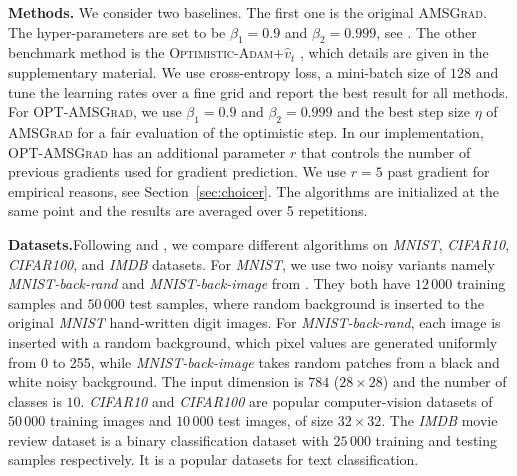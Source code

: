 \documentclass[twoside]{article}
\begin{document}
\textbf{Methods.}
We consider two baselines. The first one is the original \textsc{AMSGrad}. 
The hyper-parameters are set to be $\beta_1 = 0.9$ and $\beta_2 = 0.999$, see \citep{RKK18}. 
The other benchmark method is the \textsc{Optimistic-Adam$+\hat{v}_t$} \citep{DISZ18}, which details are given in the supplementary material. 
We use cross-entropy loss, a mini-batch size of $128$ and tune the learning rates over a fine grid and report the best result for all methods.
For \textsc{OPT-AMSGrad}, we use $\beta_1 = 0.9$ and $\beta_2 = 0.999$ and the best step size $\eta$ of \textsc{AMSGrad} for a fair evaluation of the optimistic step. In our implementation, \textsc{OPT-AMSGrad} has an additional parameter $r$ that controls the number of previous gradients used for gradient prediction. 
We use $r=5$ past gradient for empirical reasons, see Section~\ref{sec:choicer}.
The algorithms are initialized at the same point and the results are averaged over 5 repetitions.


\textbf{Datasets.}\hspace{0.1in}Following \cite{RKK18} and \cite{KB15}, we compare different algorithms on \textit{MNIST}, \textit{CIFAR10},
\textit{CIFAR100}, and \textit{IMDB} datasets. 
For \textit{MNIST}, we use two noisy variants namely \textit{MNIST-back-rand} and \textit{MNIST-back-image} from \cite{MNIST07}. 
They both have $12\,000$ training samples and $50\,000$ test samples, where random background is inserted to the original \textit{MNIST} hand-written digit images. 
For \textit{MNIST-back-rand}, each image is inserted with a random background, which pixel values are generated uniformly from 0 to 255, while \textit{MNIST-back-image} takes random patches from a black and white noisy background.
The input dimension is $784$ ($28\times 28$) and the number of classes is $10$. 
\textit{CIFAR10} and \textit{CIFAR100} are popular computer-vision datasets of $50\,000$ training images and $10\,000$ test images, of size $32\times 32$. 
The \textit{IMDB} movie review dataset is a binary classification dataset with $25\,000$ training and testing samples respectively. 
It is a popular datasets for text classification.
\end{document}
